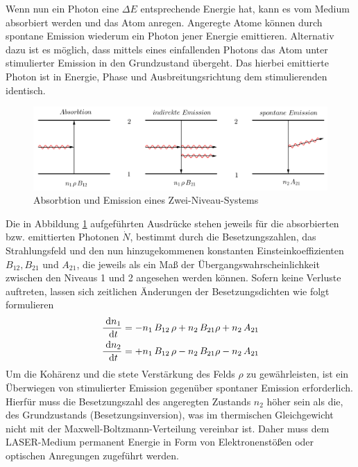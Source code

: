 Wenn nun ein Photon eine $\Delta E$ entsprechende Energie hat, kann es vom Medium absorbiert werden und das Atom anregen. 
Angeregte Atome können durch spontane Emission wiederum ein Photon jener Energie emittieren. Alternativ dazu ist es möglich,
dass mittels eines einfallenden Photons das Atom unter stimulierter Emission in den Grundzustand übergeht. Das hierbei
emittierte Photon ist in Energie, Phase und Ausbreitungsrichtung dem stimulierenden identisch. 
\begin{figure}[H]
\includegraphics[width=\textwidth]{pics/AbsEmi.png}
\caption{Absorbtion und Emission eines Zwei-Niveau-Systems}
\label{pic_AbsEmi}
\end{figure}
Die in Abbildung \ref{pic_AbsEmi} aufgeführten Ausdrücke stehen jeweils für die absorbierten bzw. emittierten Photonen $\dot N$,
bestimmt durch die Besetzungszahlen, das Strahlungsfeld und den nun hinzugekommenen konstanten Einsteinkoeffizienten $B_{12}, B_{21}$ und $A_{21}$, 
die jeweils als ein Maß der Übergangswahrscheinlichkeit zwischen den Niveaus 1 und 2 angesehen werden können. Sofern keine Verluste auftreten, lassen
sich zeitlichen Änderungen der Besetzungsdichten wie folgt formulieren
\begin{align*}
  \frac{\; \mathrm{d} n_1}{\; \mathrm{d} t} = -n_1\, B_{12}\, \rho + n_2\, B_{21} \rho + n_2\, A_{21}\\
  \frac{\; \mathrm{d} n_2}{\; \mathrm{d} t} = +n_1\, B_{12}\, \rho - n_2\, B_{21} \rho - n_2\, A_{21}
\end{align*}
Um die Kohärenz und die stete Verstärkung des Felds $\rho$ zu gewährleisten, ist ein Überwiegen von stimulierter Emission gegenüber spontaner Emission
erforderlich. Hierfür muss die Besetzungszahl des angeregten Zustands $n_2$ höher sein als die, des Grundzustands (Besetzungsinversion), was im thermischen Gleichgewicht
nicht mit der Maxwell-Boltzmann-Verteilung vereinbar ist. Daher muss dem LASER-Medium permanent Energie in Form von Elektronenstößen oder optischen
Anregungen zugeführt werden. 


